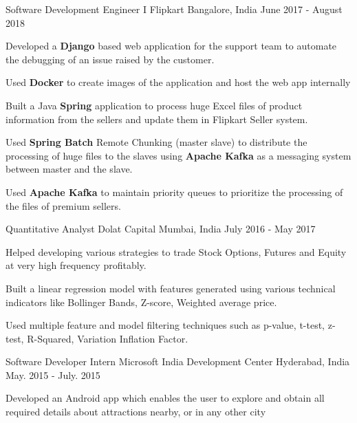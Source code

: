 \vspace{-0.8em}
\begin{cventries}
  \cventry
  {Software Development Engineer I} %
  {Flipkart} %
  {Bangalore, India} %
  {June 2017 - August 2018} %
  {
  \begin{cvitems} %
    \item {Developed a \textbf{Django} based web application for the support
    team to automate the debugging of an issue raised by the customer.}
    \item {Used \textbf{Docker} to create images of the application and host
    the web app internally}
    \item {Built a Java \textbf{Spring} application to process huge Excel
    files of product information from the sellers and update them in
    Flipkart Seller system.}
    \item {Used \textbf{Spring Batch} Remote Chunking (master slave) to
    distribute the processing of huge files to the slaves using
    \textbf{Apache Kafka} as a messaging system between master and the slave.}
    \item {Used \textbf{Apache Kafka} to maintain priority queues to
    prioritize the processing of the files of premium sellers.}
  \end{cvitems}
  }
  \cventry
  {Quantitative Analyst} %
  {Dolat Capital} %
  {Mumbai, India} %
  {July 2016 - May 2017} %
  {
  \begin{cvitems} %
    \item {Helped developing various strategies to trade Stock Options, Futures and Equity at very high frequency profitably.}
    \item {Built a linear regression model with features generated using various technical indicators like Bollinger Bands, Z-score, Weighted average price.}
    \item {Used multiple feature and model filtering techniques such as p-value, t-test, z-test, R-Squared, Variation Inflation Factor.}
  \end{cvitems}
  }
  \cventry
  {Software Developer Intern} %
  {Microsoft India Development Center} %
  {Hyderabad, India} %
  {May. 2015 - July. 2015} %
  {
  \begin{cvitems} %
    \item {Developed an Android app which enables the user to explore and obtain all required details about attractions nearby, or in any other city  }

\end{cvitems}}
\end{cventries}
